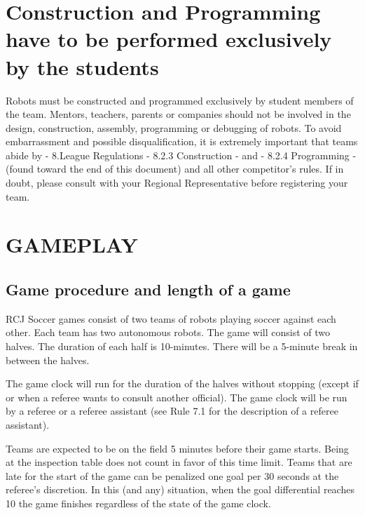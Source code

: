 \documentclass{article}
\begin{document}
\listofchanges

\section*{Construction and Programming have to be performed exclusively by the students}

Robots must be constructed and programmed exclusively by student members of the
team. Mentors, teachers, parents or companies should not be involved in the
design, construction, assembly, programming or debugging of robots. To avoid
embarrassment and possible disqualification, it is extremely important that
teams abide by - 8.League Regulations - 8.2.3 Construction - and - 8.2.4
Programming - (found toward the end of this document) and all other
competitor's rules. If in doubt, please consult with your Regional
Representative before registering your team.

\newpage

\tableofcontents

\newpage

\section{GAMEPLAY \label{ref-001}}

\subsection{Game procedure and length of a game \label{ref-002}}

RCJ Soccer games consist of two teams of robots playing soccer against
each other. Each team has two autonomous robots. The game will consist of two
halves. The duration of each half is 10-minutes. There will be a 5-minute break
in between the halves.

The game clock will run for the duration of the halves without stopping (except
if or when a referee wants to consult another official). The game clock will be run
by a referee or a referee assistant (see Rule 7.1 for the description of a
referee assistant).

Teams are expected to be on the field 5 minutes before their game
starts. Being at the inspection table does not count in favor of this time
limit. Teams that are late for the start of the game can be penalized one goal per
30 seconds at the referee's discretion. In this (and any) situation, when the goal
differential reaches 10 the game finishes regardless of the state of the game clock.
\end{document}
